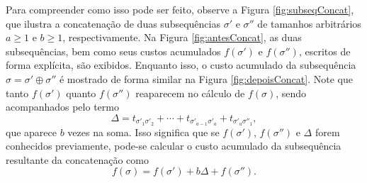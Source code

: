 Para compreender como isso pode ser feito, observe a Figura \ref{fig:subseqConcat}, que ilustra a concatenação de duas subsequências $\sigma'$ e $\sigma''$ de tamanhos arbitrários $a\geq 1$ e $b\geq 1$, respectivamente. Na Figura \ref{fig:antesConcat}, as duas subsequências, bem como seus  custos acumulados $f(\sigma')$ e $f(\sigma'')$, escritos de forma explícita, são exibidos. Enquanto isso, o custo acumulado da subsequência $\sigma = \sigma' \oplus \sigma''$ é mostrado de forma similar na Figura \ref{fig:depoisConcat}. Note que tanto $f(\sigma')$ quanto $f(\sigma'')$ reaparecem no cálculo de $f(\sigma)$, sendo acompanhados pelo termo
\[ \Delta = t_{\sigma'_1 \sigma'_2} + \cdots + t_{\sigma'_{a-1} \sigma'_a} + t_{\sigma'_a \sigma''_1}, \]
que aparece $b$ vezes na soma. Isso significa que se $f(\sigma')$, $f(\sigma'')$ e $\Delta$ forem conhecidos previamente, pode-se calcular o custo acumulado da subsequência resultante da concatenação como
\[ f(\sigma) = f(\sigma') + b \Delta + f(\sigma''). \]

